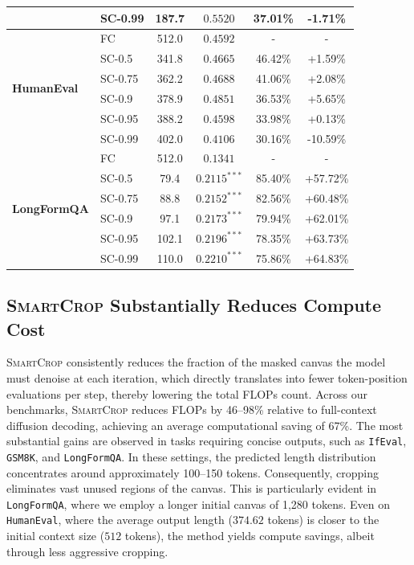 \documentclass{article}
\theoremstyle{plain}
\theoremstyle{definition}
\theoremstyle{remark}
\begin{document}
\begin{table}[t]
\begin{tabular}{llc|ccc}
 & \textsc{SC-0.99} & 187.7 & $0.5520$ & 37.01\% & -1.71\% \\
\midrule
\multirow{6}{*}{\textbf{HumanEval}} & FC & 512.0 & $0.4592$ & - & - \\
 & \textsc{SC-0.5} & 341.8 & $0.4665$ & 46.42\% & +1.59\% \\
 & \textsc{SC-0.75} & 362.2 & $0.4688$ & 41.06\% & +2.08\% \\
 & \textsc{SC-0.9} & 378.9 & $\bm{0.4851}$ & 36.53\% & +5.65\% \\
 & \textsc{SC-0.95} & 388.2 & $0.4598$ & 33.98\% & +0.13\% \\
 & \textsc{SC-0.99} & 402.0 & $0.4106$ & 30.16\% & -10.59\% \\
 \midrule
 \multirow{6}{*}{\textbf{LongFormQA}} & FC & 512.0 & $0.1341$ & - & - \\
 & \textsc{SC-0.5} & 79.4 & $0.2115^{***}$ & 85.40\% & +57.72\% \\
 & \textsc{SC-0.75} & 88.8 & $0.2152^{***}$ & 82.56\% & +60.48\% \\
 & \textsc{SC-0.9} & 97.1 & $0.2173^{***}$ & 79.94\% & +62.01\% \\
 & \textsc{SC-0.95} & 102.1 & $0.2196^{***}$ & 78.35\% & +63.73\% \\
 & \textsc{SC-0.99} & 110.0 & $\bm{0.2210}^{***}$ & 75.86\% & +64.83\% \\
\bottomrule
\end{tabular}
\end{table}


\subsection{\textsc{SmartCrop} Substantially Reduces Compute Cost}

\textsc{SmartCrop} consistently reduces the fraction of the masked canvas the model must denoise at each iteration, which directly translates into fewer token-position evaluations per step, thereby lowering the total FLOPs count. Across our benchmarks, \textsc{SmartCrop} reduces FLOPs by 46--98\% relative to full-context diffusion decoding, achieving an average computational saving of 67\%. The most substantial gains are observed in tasks requiring concise outputs, such as \verb|IfEval|, \verb|GSM8K|, and \verb|LongFormQA|. In these settings, the predicted length distribution concentrates around approximately 100--150 tokens. Consequently, cropping eliminates vast unused regions of the canvas. This is particularly evident in \verb|LongFormQA|, where we employ a longer initial canvas of 1,280 tokens. Even on \verb|HumanEval|, where the average output length ($374.62$ tokens) is closer to the initial context size ($512$ tokens), the method yields compute savings, albeit through less aggressive cropping. 
\end{document}
